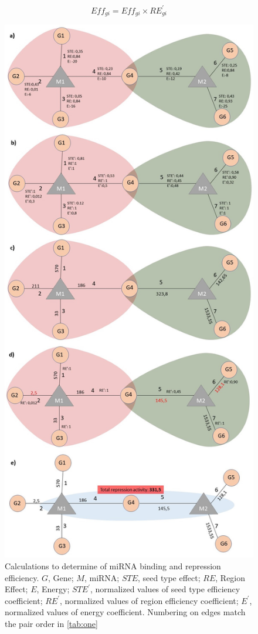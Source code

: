 \documentclass[]{article}
\begin{document}
\begin{equation}
Eff_{gi}= Eff_{gi}\times RE^\prime_{gi} \tag{4}\label{eq:4}
\end{equation}

\begin{figure}
\hypertarget{fig2}{%
\centering
\includegraphics{fig2.jpg}
\caption{Calculations to determine of miRNA binding and repression
efficiency. \(G\), Gene; \(M\), miRNA; \(STE\), seed type effect;
\(RE\), Region Effect; \(E\), Energy; \(STE^\prime\), normalized values
of seed type efficiency coefficient; \(RE^\prime\), normalized values of
region efficiency coefficient; \(E^\prime\), normalized values of energy
coefficient. Numbering on edges match the pair order in
\autoref{tab:one}}\label{fig2}
}
\end{figure}
\end{document}
